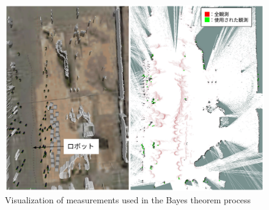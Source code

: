 \documentclass{jarticle}
\begin{document}
%
%




\begin{figure}[t]
  \centering
   \includegraphics[width=0.8\linewidth]{fig/particle_1000_observation_1_mcl.png}
   \caption{Visualization of measurements used in the Bayes theorem process}
   \label{fig:スタートからゴールまでナビゲーション}
\end{figure}
\end{document}
